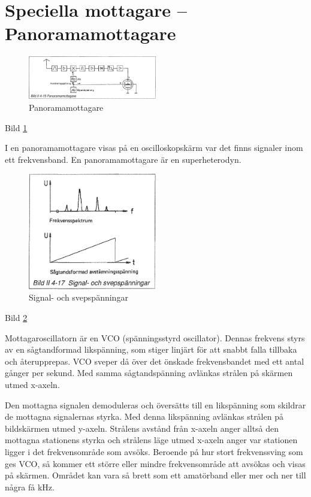 \section{Speciella mottagare -- Panoramamottagare}

\begin{figure}
  \includegraphics[width=0.5\textwidth]{images/bild_2_4-15}
  \caption{Panoramamottagare}
  \label{fig:bildII4-15}
\end{figure}

Bild \ref{fig:bildII4-15}

I en panoramamottagare visas på en oscilloskopskärm var det finns
signaler inom ett frekvensband. En panoramamottagare är en
superheterodyn.

\begin{figure}
  \includegraphics[width=0.5\textwidth]{images/bild_2_4-17}
  \caption{Signal- och svepspänningar}
  \label{fig:bildII4-17}
\end{figure}

Bild \ref{fig:bildII4-17}

Mottagaroscillatorn är en VCO (spänningsstyrd oscillator). Dennas
frekvens styrs av en sågtandformad likspänning, som stiger linjärt för
att snabbt falla tillbaka och återupprepas. VCO sveper då över det
önskade frekvensbandet med ett antal gånger per sekund. Med
samma sågtandspänning avlänkas strålen på skärmen utmed x-axeln.

Den mottagna signalen demoduleras och översätts till en likspänning
som skildrar de mottagna signalernas styrka. Med denna likspänning
avlänkas strålen på bildskärmen utmed y-axeln. Strålens avstånd från
x-axeln anger alltså den mottagna stationens styrka och strålens läge
utmed x-axeln anger var stationen ligger i det frekvensområde som
avsöks. Beroende på hur stort frekvenssving som ges VCO, så kommer ett
större eller mindre frekvensområde att avsökas och visas på
skärmen. Området kan vara så brett som ett amatörband eller mer och
ner till några få kHz.

